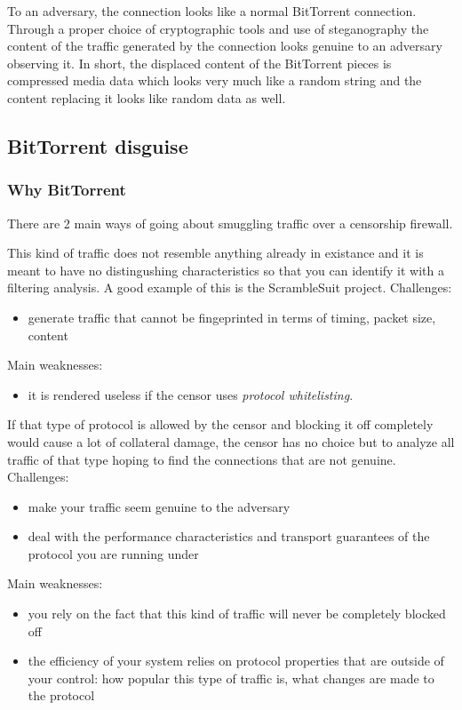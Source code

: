 \documentclass[11pt]{article} %
\begin{document}
To an adversary, the connection looks like a normal BitTorrent connection. Through a proper choice of cryptographic tools and use of steganography the content of the traffic generated by the connection looks genuine to an adversary observing it. In short, the displaced content of the BitTorrent pieces is compressed media data which looks very much like a random string and the content replacing it looks like random data as well.

\subsection{BitTorrent disguise}
\label{subsec:btDisguise}



\subsubsection{Why BitTorrent}
There are 2 main ways of going about smuggling traffic over a censorship firewall.


This kind of traffic does not resemble anything already in existance and it is meant to have no distingushing characteristics so that you can identify it with a filtering analysis. A good example of this is the ScrambleSuit project.
Challenges:
\begin{itemize}
\item generate traffic that cannot be fingeprinted in terms of timing, packet size, content
\end{itemize}
Main weaknesses:
\begin{itemize}
\item it is rendered useless if the censor uses \textit{protocol whitelisting}. 
\end{itemize}



If that type of protocol is allowed by the censor and blocking it off completely would cause a lot of collateral damage, the censor has no choice but to analyze all traffic of that type hoping to find the connections that 
are not genuine.
Challenges:
\begin{itemize}
\item make your traffic seem genuine to the adversary
\item deal with the performance characteristics and transport guarantees of the protocol you are running under
\end{itemize}
Main weaknesses:
\begin{itemize}
\item you rely on the fact that this kind of traffic will never be completely blocked off
\item the efficiency of your system relies on protocol properties that are outside of your control: how popular this type of traffic is, what changes are made to the protocol 
\end{itemize}
\end{document}
